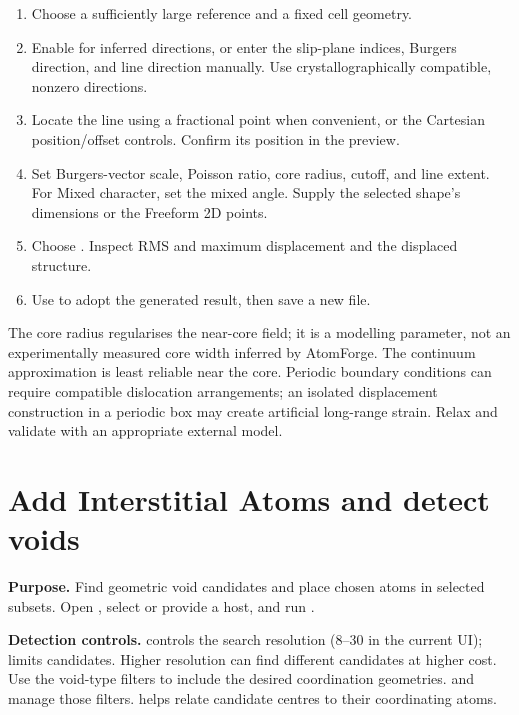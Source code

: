 \begin{enumerate}
\item Choose a sufficiently large reference and a fixed cell geometry.
\item Enable  for inferred directions, or enter the slip-plane indices, Burgers direction, and line direction manually. Use crystallographically compatible, nonzero directions.
\item Locate the line using a fractional point when convenient, or the Cartesian position/offset controls. Confirm its position in the preview.
\item Set Burgers-vector scale, Poisson ratio, core radius, cutoff, and line extent. For Mixed character, set the mixed angle. Supply the selected shape's dimensions or the Freeform 2D points.
\item Choose . Inspect RMS and maximum displacement and the displaced structure.
\item Use  to adopt the generated result, then save a new file.
\end{enumerate}
The core radius regularises the near-core field; it is a modelling parameter, not an experimentally measured core width inferred by AtomForge. The continuum approximation is least reliable near the core. Periodic boundary conditions can require compatible dislocation arrangements; an isolated displacement construction in a periodic box may create artificial long-range strain. Relax and validate with an appropriate external model.

\section{Add Interstitial Atoms and detect voids}
\textbf{Purpose.} Find geometric void candidates and place chosen atoms in selected subsets. Open , select  or provide a host, and run .

\textbf{Detection controls.}  controls the search resolution (8--30 in the current UI);  limits candidates. Higher resolution can find different candidates at higher cost. Use the void-type filters to include the desired coordination geometries.  and  manage those filters.  helps relate candidate centres to their coordinating atoms.

